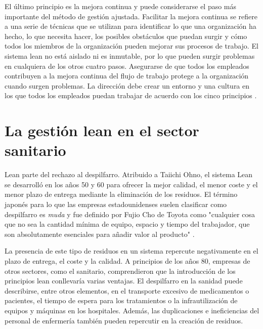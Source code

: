 El último principio es la mejora continua y puede considerarse el paso más importante del método de gestión ajustada.
Facilitar la mejora continua se refiere a una serie de técnicas que se utilizan para identificar lo que una organización ha hecho, lo que necesita hacer, los posibles obstáculos que puedan surgir y cómo todos los miembros de la organización pueden mejorar sus procesos de trabajo.
El sistema lean no está aislado ni es inmutable, por lo que pueden surgir problemas en cualquiera de los otros cuatro pasos.
Asegurarse de que todos los empleados contribuyen a la mejora continua del flujo de trabajo protege a la organización cuando surgen problemas.
La dirección debe crear un entorno y una cultura en los que todos los empleados puedan trabajar de acuerdo con los cinco principios \cite{ohno_toyota_1988,bertagnolli_lean_2018}.

\section{La gestión lean en el sector sanitario}

Lean parte del rechazo al despilfarro. Atribuido a Taiichi Ohno, el sistema Lean se desarrolló en los años 50 y 60 para ofrecer la mejor calidad, el menor coste y el menor plazo de entrega mediante la eliminación de los residuos.
El término japonés para lo que las empresas estadounidenses suelen clasificar como despilfarro es \textit{muda} y fue definido por Fujio Cho de Toyota como "cualquier cosa que no sea la cantidad mínima de equipo, espacio y tiempo del trabajador, que son absolutamente esenciales para añadir valor al producto" \cite{helmold_lean_2020}.

La presencia de este tipo de residuos en un sistema repercute negativamente en el plazo de entrega, el coste y la calidad.
A principios de los años 80, empresas de otros sectores, como el sanitario, comprendieron que la introducción de los principios lean conllevaría varias ventajas.
El despilfarro en la sanidad puede describirse, entre otros elementos, en el transporte excesivo de medicamentos o pacientes, el tiempo de espera para los tratamientos o la infrautilización de equipos y máquinas en los hospitales. Además, las duplicaciones e ineficiencias del personal de enfermería también pueden repercutir en la creación de residuos.

